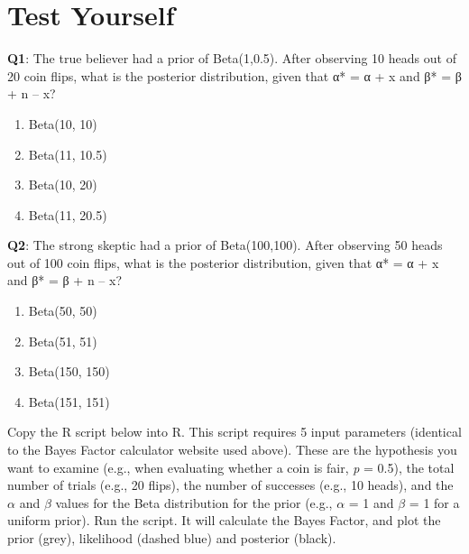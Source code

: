 \documentclass[
  oneside]{krantz}
\providecommand{\tightlist}{%
  \setlength{\itemsep}{0pt}\setlength{\parskip}{0pt}}
\begin{document}
\hypertarget{test-yourself-3}{%
\section{Test Yourself}\label{test-yourself-3}}

\textbf{Q1}: The true believer had a prior of Beta(1,0.5). After observing 10 heads out of 20 coin flips, what is the posterior distribution, given that α* = α + x and β* = β + n -- x?

\begin{enumerate}
\def\labelenumi{\Alph{enumi})}
\tightlist
\item
  Beta(10, 10)
\item
  Beta(11, 10.5)
\item
  Beta(10, 20)
\item
  Beta(11, 20.5)
\end{enumerate}

\textbf{Q2}: The strong skeptic had a prior of Beta(100,100). After observing 50 heads out of 100 coin flips, what is the posterior distribution, given that α* = α + x and β* = β + n -- x?

\begin{enumerate}
\def\labelenumi{\Alph{enumi})}
\tightlist
\item
  Beta(50, 50)
\item
  Beta(51, 51)
\item
  Beta(150, 150)
\item
  Beta(151, 151)
\end{enumerate}

Copy the R script below into R. This script requires 5 input parameters (identical to the Bayes Factor calculator website used above). These are the hypothesis you want to examine (e.g., when evaluating whether a coin is fair, \emph{p} = 0.5), the total number of trials (e.g., 20 flips), the number of successes (e.g., 10 heads), and the \(\alpha\) and \(\beta\) values for the Beta distribution for the prior (e.g., \(\alpha\) = 1 and \(\beta\) = 1 for a uniform prior). Run the script. It will calculate the Bayes Factor, and plot the prior (grey), likelihood (dashed blue) and posterior (black).
\end{document}
